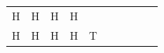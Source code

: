 {{\begin{center}
\begin{tabular}[t]{|l|l|l|l|l|l|l|l|l|l|}
        H &
    
    
        H &
    
    
        H &
    
    
        H%
     \tabularnewline\cline{1-1}\cline{2-2}\cline{3-3}\cline{4-4}\cline{5-5}\cline{6-6}\cline{7-7}\cline{8-8}\cline{9-9}\cline{10-10}
    
    
        H &
    
    
        H &
    
    
        H &
    
    
        H &
    
    
        T &
    

\end{tabular}
\end{center}}}
